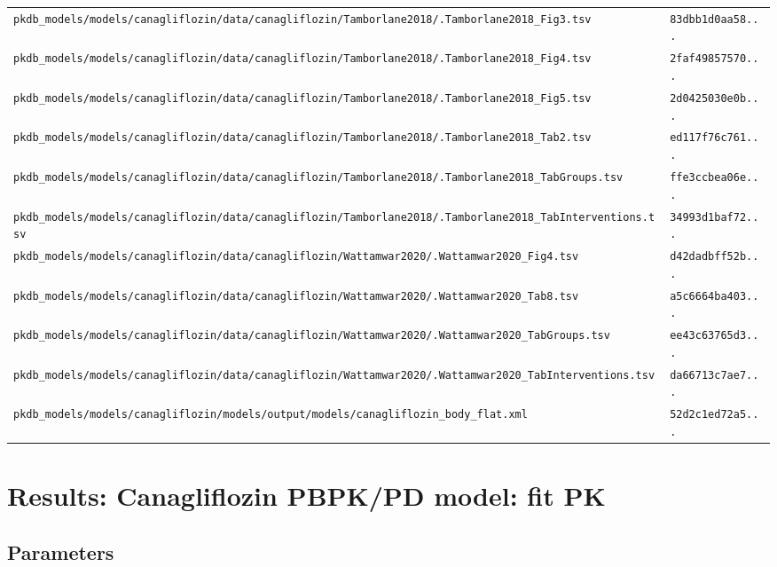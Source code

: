\begin{longtable}{ll}
\texttt{pkdb\_models/models/canagliflozin/data/canagliflozin/Tamborlane2018/.Tamborlane2018\_Fig3.tsv} & \texttt{83dbb1d0aa58...} \\
\texttt{pkdb\_models/models/canagliflozin/data/canagliflozin/Tamborlane2018/.Tamborlane2018\_Fig4.tsv} & \texttt{2faf49857570...} \\
\texttt{pkdb\_models/models/canagliflozin/data/canagliflozin/Tamborlane2018/.Tamborlane2018\_Fig5.tsv} & \texttt{2d0425030e0b...} \\
\texttt{pkdb\_models/models/canagliflozin/data/canagliflozin/Tamborlane2018/.Tamborlane2018\_Tab2.tsv} & \texttt{ed117f76c761...} \\
\texttt{pkdb\_models/models/canagliflozin/data/canagliflozin/Tamborlane2018/.Tamborlane2018\_TabGroups.tsv} & \texttt{ffe3ccbea06e...} \\
\texttt{pkdb\_models/models/canagliflozin/data/canagliflozin/Tamborlane2018/.Tamborlane2018\_TabInterventions.tsv} & \texttt{34993d1baf72...} \\
\texttt{pkdb\_models/models/canagliflozin/data/canagliflozin/Wattamwar2020/.Wattamwar2020\_Fig4.tsv} & \texttt{d42dadbff52b...} \\
\texttt{pkdb\_models/models/canagliflozin/data/canagliflozin/Wattamwar2020/.Wattamwar2020\_Tab8.tsv} & \texttt{a5c6664ba403...} \\
\texttt{pkdb\_models/models/canagliflozin/data/canagliflozin/Wattamwar2020/.Wattamwar2020\_TabGroups.tsv} & \texttt{ee43c63765d3...} \\
\texttt{pkdb\_models/models/canagliflozin/data/canagliflozin/Wattamwar2020/.Wattamwar2020\_TabInterventions.tsv} & \texttt{da66713c7ae7...} \\
\texttt{pkdb\_models/models/canagliflozin/models/output/models/canagliflozin\_body\_flat.xml} & \texttt{52d2c1ed72a5...} \\
\end{longtable}

\section{Results: Canagliflozin PBPK/PD model: fit PK}

\subsection{Parameters}

